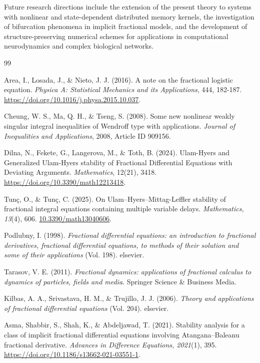 \documentclass[12pt,a4paper]{article}
\numberwithin{equation}{section}
\begin{document}
	Future research directions include the extension of the present theory to systems with nonlinear and state-dependent distributed memory kernels, the investigation of bifurcation phenomena in implicit fractional models, and the development of structure-preserving numerical schemes for applications in computational neurodynamics and complex biological networks.
	
	\begin{thebibliography}{99}
	
	Area, I., Losada, J., \& Nieto, J. J. (2016). A note on the fractional logistic equation. \textit{Physica A: Statistical Mechanics and its Applications}, 444, 182-187. \url{https://doi.org/10.1016/j.physa.2015.10.037}.
	
	Cheung, W. S., Ma, Q. H., \& Tseng, S. (2008). Some new nonlinear weakly singular integral inequalities of Wendroff type with applications. \textit{Journal of Inequalities and Applications}, 2008, Article ID 909156.
	
	Dilna, N., Fekete, G., Langerova, M., \& Toth, B. (2024). Ulam-Hyers and Generalized Ulam-Hyers stability of Fractional Differential Equations with Deviating Arguments. \textit{Mathematics}, 12(21), 3418. \url{https://doi.org/10.3390/math12213418}.
	
	Tunç, O., \& Tunç, C. (2025). On Ulam–Hyers–Mittag-Leffler stability of fractional integral equations containing multiple variable delays. \emph{Mathematics, 13}(4), 606. \url{10.3390/math13040606}.
	
	Podlubny, I. (1998). \emph{Fractional differential equations: an introduction to fractional derivatives, fractional differential equations, to methods of their solution and some of their applications} (Vol. 198). elsevier.
	
	Tarasov, V. E. (2011). \emph{Fractional dynamics: applications of fractional calculus to dynamics of particles, fields and media}. Springer Science \& Business Media.
	
	Kilbas, A. A., Srivastava, H. M., \& Trujillo, J. J. (2006). \emph{Theory and applications of fractional differential equations} (Vol. 204). elsevier.
	
	Asma, Shabbir, S., Shah, K., \& Abdeljawad, T. (2021). Stability analysis for a class of implicit fractional differential equations involving Atangana–Baleanu fractional derivative. \emph{Advances in Difference Equations, 2021}(1), 395. \url{https://doi.org/10.1186/s13662-021-03551-1}.
	

\end{thebibliography}
\end{document}
